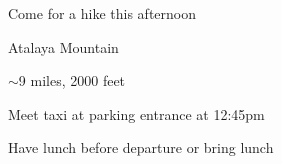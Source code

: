 \begin{slide}{Come for a hike this afternoon}
\vspace{1.5cm}
\begin{center}\begin{minipage}{0.5\linewidth}
\begin{list0}
\item Atalaya Mountain
\item $\sim$9 miles, 2000 feet
\item Meet taxi at parking entrance at 12:45pm
\item Have lunch before departure or bring lunch
\end{list0}
\end{minipage}\end{center}
\end{slide}
